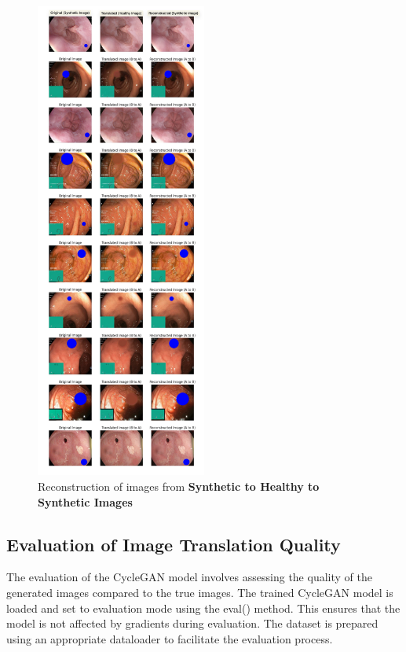\documentclass[UKenglish,12pt]{master-style}
\begin{document}
\begin{figure}[htbp]
    \centering
    \includegraphics[width=0.5\textwidth]{Images/B-A-B.jpeg}
    \caption{Reconstruction of images from \textbf{Synthetic to Healthy to Synthetic Images}}
    \label{fig:B-A-B}
\end{figure}

\subsection{Evaluation of Image Translation Quality}

The evaluation of the CycleGAN model involves assessing the quality of the generated images compared to the true images. 
The trained CycleGAN model is loaded and set to evaluation mode using the eval() method. This ensures that the model is not affected by gradients during evaluation. The dataset is prepared using an appropriate dataloader to facilitate the evaluation process.
\end{document}
